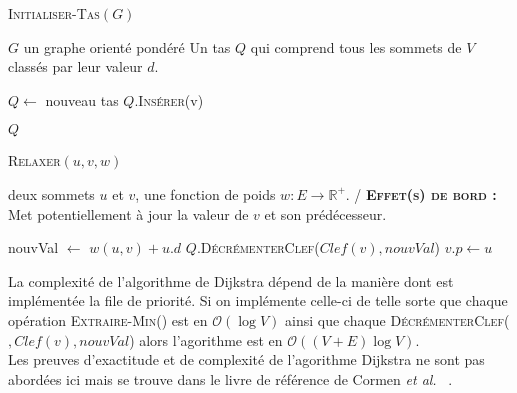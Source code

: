 
\begin{algorithm}
	\caption{\textsc {Initialiser-Tas}$(G)$}
	 \label{algo:initTas}
	\begin{algorithmic}[1]
		\REQUIRE $G$ un graphe orienté pondéré
		\ENSURE Un tas $Q$ qui comprend tous les sommets de $V$ classés par leur valeur $d$.
		
		\STATE $Q \leftarrow$ nouveau tas 
			\STATE $Q.$\textsc{Insérer}(v)
		\ENDFOR
		
		\RETURN $Q$
	
			
\end{algorithmic}
		
\end{algorithm}


\begin{algorithm}
	\caption{\textsc {Relaxer}$(u,v,w)$}
	 \label{algo:relaxer}
	\begin{algorithmic}[1]
		\REQUIRE deux sommets $u$ et $v$, une fonction de poids $w : E \rightarrow \mathbb{R}^{+}$.
		\ENSURE / \textbf{\textsc{Effet(s) de bord :}} Met potentiellement à jour la  valeur de $v$ et son prédécesseur.
		
		\STATE nouvVal $\leftarrow$ $w(u,v) + u.d$
			\STATE $Q.$\textsc{DécrémenterClef}($Clef(v),nouvVal$)
			\STATE $v.p \leftarrow u$
		\ENDIF
	
			
\end{algorithmic}
		
\end{algorithm}

La complexité de l'algorithme de Dijkstra dépend de la manière dont est implémentée la file de priorité. Si on implémente celle-ci de telle sorte que chaque opération \textsc{Extraire-Min}() est en $\mathcal{O}(\log V)$ ainsi que chaque \textsc{DécrémenterClef}($,Clef(v),nouvVal$) alors l'agorithme est en $\mathcal{O}((V + E) \log V)$.\\
Les preuves d'exactitude et de complexité de l'agorithme Dijkstra ne sont pas abordées ici mais se trouve dans le livre de référence de Cormen \emph{et al.} ~\cite{Cormen:2009:IA:580470}.



\clearpage

